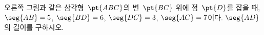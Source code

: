 \noindent\begin{minipage}[t]{0.58\linewidth}\vspace{0pt}\raggedright 오른쪽 그림과 같은 삼각형~$\pt{ABC}$의 변~$\pt{BC}$ 위에 점~$\pt{D}$를 잡을 때, $\seg{AB}=5$, $\seg{BD}=6$, $\seg{DC}=3$, $\seg{AC}=7$이다. $\seg{AD}$의 길이를 구하시오.\end{minipage}\hfill\begin{minipage}[t]{0.4\linewidth}\vspace{0pt}\centering \resizebox{\ifdim\width>\linewidth\linewidth\else\width\fi}{!}{}\end{minipage}\par
